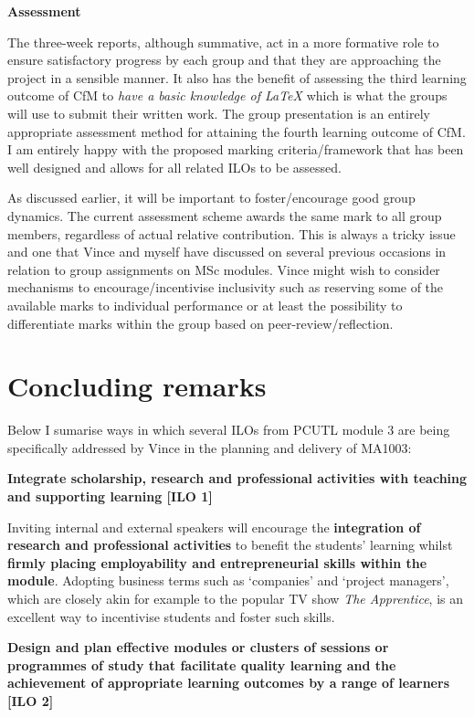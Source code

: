 \documentclass[a4paper,12pt]{article}
\begin{document}
\textbf{Assessment}

The three-week reports, although summative, act in a more formative role to ensure satisfactory progress by each group and that they are approaching the project in a sensible manner. It also has the benefit of assessing the third learning outcome of CfM to \emph{have a basic knowledge of LaTeX} which is what the groups will use to submit their written work. The group presentation is an entirely appropriate assessment method for attaining the fourth learning outcome of CfM. I am entirely happy with the proposed marking criteria/framework that has been well designed and allows for all related ILOs to be assessed.

As discussed earlier, it will be important to foster/encourage good group dynamics. The current assessment scheme awards the same mark to all group members, regardless of actual relative contribution. This is always a tricky issue and one that Vince and myself have discussed on several previous occasions in relation to group assignments on MSc modules. Vince might wish to consider mechanisms to encourage/incentivise inclusivity such as reserving some of the available marks to individual performance or at least the possibility to differentiate marks within the group based on peer-review/reflection.


\section{Concluding remarks}

Below I sumarise ways in which several ILOs from PCUTL module 3 are being specifically addressed by Vince in the planning and delivery of MA1003:

\textbf {Integrate scholarship, research and professional activities with teaching and supporting learning [ILO 1]}

Inviting internal and external speakers will encourage the \textbf{integration of research and professional activities} to benefit the students' learning whilst \textbf{firmly placing employability and entrepreneurial skills within the module}. Adopting business terms such as `companies' and `project managers', which are closely akin for example to the popular TV show \emph {The Apprentice}, is an excellent way to incentivise students and foster such skills.

\textbf {Design and plan effective modules or clusters of sessions or programmes of study that facilitate quality learning and the achievement of appropriate learning outcomes by a range of learners [ILO 2]}
\end{document}

